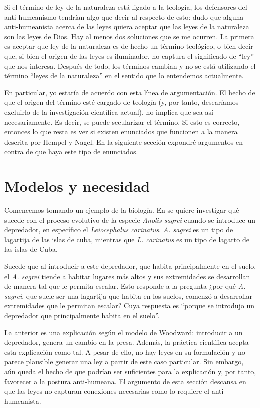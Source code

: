 Si el término de ley de la naturaleza está ligado a la teología, los defensores del anti-humeanismo tendrían algo que decir al respecto de esto: dudo que alguna anti-humeanista acerca de las leyes quiera aceptar que las leyes de la naturaleza son las leyes de Dios. Hay al menos dos soluciones que se me ocurren. La primera es aceptar que ley de la naturaleza es de hecho un término teológico, o bien decir que, si bien el origen de las leyes es iluminador, no captura el significado de ``ley'' que nos interesa. Después de todo, los términos cambian y no se está utilizando el término ``leyes de la naturaleza'' en el sentido que lo entendemos actualmente.

En particular, yo estaría de acuerdo con esta línea de argumentación. El hecho de que el origen del término esté cargado de teología (y, por tanto, desearíamos excluirlo de la investigación científica actual), no implica que sea así necesariamente. Es decir, se puede secularizar el término. Si esto es correcto, entonces lo que resta es ver si existen enunciados que funcionen a la manera descrita por Hempel y Nagel. En la siguiente sección expondré argumentos en contra de que haya este tipo de enunciados.

\section{Modelos y necesidad}

\noindent Comencemos tomando un ejemplo de la biología. En \cite{Losos2004} se quiere investigar qué sucede con el proceso evolutivo de la especie \textit{Anolis sagrei} cuando se introduce un depredador, en específico el \textit{Leiocephalus carinatus}. \textit{A. sagrei}  es un tipo de lagartija de las islas de cuba, mientras que \textit{L. carinatus} es un tipo de lagarto de las islas de Cuba.

Sucede que al introducir a este depredador, que habita principalmente en el suelo, el \textit{A. sagrei} tiende a habitar lugares más altos y sus extremidades se desarrollan de manera tal que le permita escalar. Esto responde a la pregunta ¿por qué \textit{A. sagrei}, que suele ser una lagartija que habita en los suelos, comenzó a desarrollar extremidades que le permitan escalar? Cuya respuesta es ``porque se introdujo un depredador que principalmente habita en el suelo''.

La anterior es una explicación según el modelo de Woodward: introducir a un depredador, genera un cambio en la presa. Además, la práctica científica acepta esta explicación como tal. A pesar de ello, no hay leyes en su formulación y no parece plausible generar una ley a partir de este caso particular. Sin embargo, aún queda el hecho de que podrían ser suficientes para la explicación y, por tanto, favorecer a la postura anti-humeana. El argumento de esta sección descansa en que las leyes no capturan conexiones necesarias como lo requiere el anti-humeanista.


